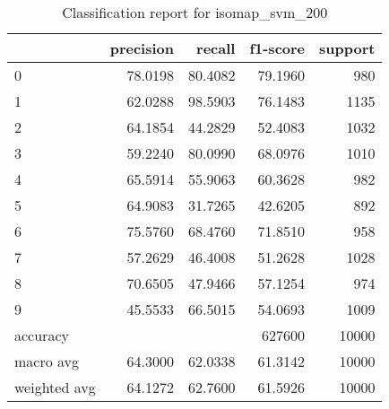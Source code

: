 \begin{table}[htb!]
\centering
\begin{tabular}{lrrrr}
    \toprule
 & precision & recall & f1-score & support \\
\midrule
0 & 78.0198 & 80.4082 & 79.1960 & 980 \\
1 & 62.0288 & 98.5903 & 76.1483 & 1135 \\
2 & 64.1854 & 44.2829 & 52.4083 & 1032 \\
3 & 59.2240 & 80.0990 & 68.0976 & 1010 \\
4 & 65.5914 & 55.9063 & 60.3628 & 982 \\
5 & 64.9083 & 31.7265 & 42.6205 & 892 \\
6 & 75.5760 & 68.4760 & 71.8510 & 958 \\
7 & 57.2629 & 46.4008 & 51.2628 & 1028 \\
8 & 70.6505 & 47.9466 & 57.1254 & 974 \\
9 & 45.5533 & 66.5015 & 54.0693 & 1009 \\
accuracy & & & 627600 & 10000 \\
macro avg & 64.3000 & 62.0338 & 61.3142 & 10000 \\
weighted avg & 64.1272 & 62.7600 & 61.5926 & 10000 \\
\bottomrule
\end{tabular}
\caption{Classification report for isomap_svm_200}
\label{tab:classification-report-isomap_svm_200}
\end{table}
